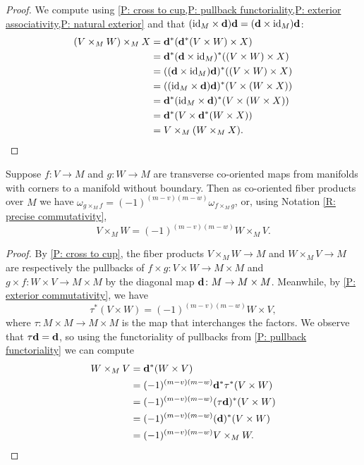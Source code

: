 \begin{proof}
	We compute using \cref{P: cross to cup,P: pullback functoriality,P: exterior associativity,P: natural exterior} and that $(\mathrm{id}_M \times \mathbf{d})\mathbf{d} = (\mathbf{d} \times \mathrm{id}_M)\mathbf{d}$:
	\begin{align*}
		(V \times_M W) \times_M X& = \mathbf{d}^*(\mathbf{d}^*(V \times W) \times X)\\
		& = \mathbf{d}^*(\mathbf{d} \times \mathrm{id}_M)^*((V \times W) \times X)\\
		& = ((\mathbf{d} \times \mathrm{id}_M)\mathbf{d})^*((V \times W) \times X)\\
		& = ((\mathrm{id}_M \times \mathbf{d})\mathbf{d})^*(V \times (W \times X))\\
		& = \mathbf{d}^*(\mathrm{id}_M \times \mathbf{d})^*(V \times (W \times X))\\
		& = \mathbf{d}^*(V \times \mathbf{d}^*(W \times X))\\
		& = V \times_M (W \times_M X).\qedhere
	\end{align*}
\end{proof}


\begin{proposition}\label{P: graded comm}
	Suppose $f \colon V \to M$ and $g \colon W \to M$ are transverse co-oriented maps from manifolds with corners to a manifold without boundary.
	Then as co-oriented fiber products over $M$ we have $\omega_{g \times_M f} = (-1)^{(m-v)(m-w)} \omega_{f \times_M g}$, or, using Notation \ref{R: precise commutativity},
	$$V \times_M W = (-1)^{(m-v)(m-w)} W \times_M V.$$
\end{proposition}

\begin{proof}
	By \cref{P: cross to cup}, the fiber products $V \times_M W \to M$ and $W \times_M V \to M$ are respectively the pullbacks of $f \times g \colon V \times W \to M \times M$ and $g \times f \colon W \times V \to M \times M$ by the diagonal map $\mathbf{d} \colon M \to M \times M$.
	Meanwhile, by \cref{P: exterior commutativity}, we have
	$$\tau^*(V \times W) = (-1)^{(m-v)(m-w)}W \times V,$$
	where $\tau \colon M \times M \to M \times M$ is the map that interchanges the factors.
	We observe that $\tau \mathbf{d} = \mathbf{d}$, so using the functoriality of pullbacks from \cref{P: pullback functoriality} we can compute
	\begin{align*}
	W \times_M V &= \mathbf{d}^*(W \times V)\\
	&= (-1)^{(m-v)(m-w)} \mathbf{d}^* \tau^*(V \times W)\\
	&= (-1)^{(m-v)(m-w)}(\tau \mathbf{d})^*(V \times W)\\
	&= (-1)^{(m-v)(m-w)}(\mathbf{d})^*(V \times W)\\
	&= (-1)^{(m-v)(m-w)} V \times_M W.\qedhere
	\end{align*}
\end{proof}

